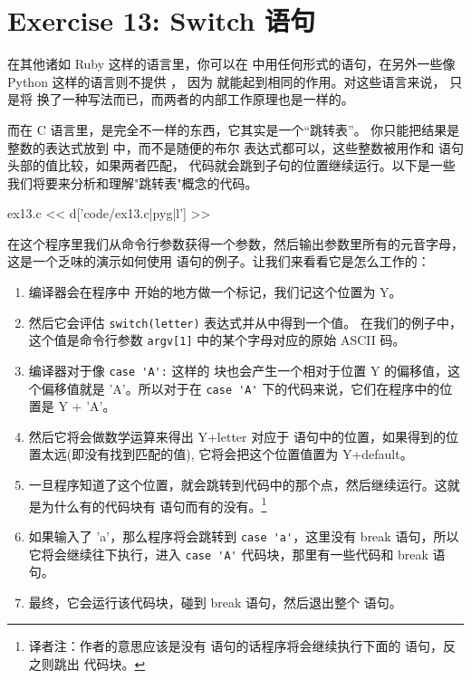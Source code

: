 \chapter{Exercise 13: Switch 语句}

在其他诸如 Ruby 这样的语言里，你可以在 
中用任何形式的语句，在另外一些像 Python 这样的语言则不提供 ，
因为 就能起到相同的作用。对这些语言来说， 只是将 
换了一种写法而已，而两者的内部工作原理也是一样的。

而在 C 语言里，是完全不一样的东西，它其实是一个“跳转表”。
你只能把结果是整数的表达式放到 中，而不是随便的布尔 
表达式都可以，这些整数被用作和  语句头部的值比较，如果两者匹配，
代码就会跳到子句的位置继续运行。以下是一些我们将要来分析和理解"跳转表"概念的代码。

\begin{code}{ex13.c}
<< d['code/ex13.c|pyg|l'] >>
\end{code}

在这个程序里我们从命令行参数获得一个参数，然后输出参数里所有的元音字母，这是一个乏味的演示如何使用  语句的例子。让我们来看看它是怎么工作的：
\begin{enumerate}

\item 编译器会在程序中 开始的地方做一个标记，我们记这个位置为 Y。
\item 然后它会评估 \verb|switch(letter)| 表达式并从中得到一个值。
在我们的例子中，这个值是命令行参数 \verb|argv[1]| 中的某个字母对应的原始 ASCII 码。
\item 编译器对于像 \verb|case 'A':| 这样的  块也会产生一个相对于位置 Y 的偏移值，这个偏移值就是 'A'。所以对于在 \verb|case 'A'| 下的代码来说，它们在程序中的位置是 Y + 'A'。
\item 然后它将会做数学运算来得出 Y+letter 对应于  语句中的位置，如果得到的位置太远(即没有找到匹配的值), 它将会把这个位置值置为 Y+default。
\item 一旦程序知道了这个位置，就会跳转到代码中的那个点，然后继续运行。这就是为什么有的代码块有  语句而有的没有。\footnote{译者注：作者的意思应该是没有  语句的话程序将会继续执行下面的  语句，反之则跳出  代码块。}
\item 如果输入了 'a'，那么程序将会跳转到 \verb|case 'a'|，这里没有 break 语句，所以它将会继续往下执行，进入 \verb|case 'A'| 代码块，那里有一些代码和 break 语句。
\item 最终，它会运行该代码块，碰到 break 语句，然后退出整个  语句。
\end{enumerate}

